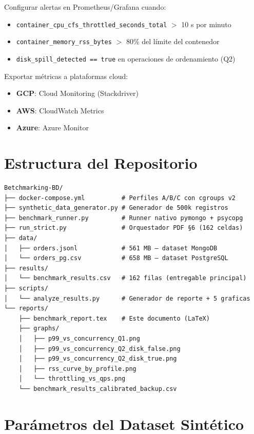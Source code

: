 \documentclass[12pt,a4paper]{article}
\begin{document}
Configurar alertas en Prometheus/Grafana cuando:
\begin{itemize}
  \item \texttt{container\_cpu\_cfs\_throttled\_seconds\_total} $>$ 10 s por minuto
  \item \texttt{container\_memory\_rss\_bytes} $>$ 80\% del límite del contenedor
  \item \texttt{disk\_spill\_detected == true} en operaciones de ordenamiento (Q2)
\end{itemize}

Exportar métricas a plataformas cloud:
\begin{itemize}
  \item \textbf{GCP}: Cloud Monitoring (Stackdriver)
  \item \textbf{AWS}: CloudWatch Metrics
  \item \textbf{Azure}: Azure Monitor
\end{itemize}

\appendix

\section{Estructura del Repositorio}

\begin{lstlisting}[caption={Árbol de archivos del proyecto}]
Betchmarking-BD/
├── docker-compose.yml          # Perfiles A/B/C con cgroups v2
├── synthetic_data_generator.py # Generador de 500k registros
├── benchmark_runner.py         # Runner nativo pymongo + psycopg
├── run_strict.py               # Orquestador PDF §6 (162 celdas)
├── data/
│   ├── orders.jsonl            # 561 MB — dataset MongoDB
│   └── orders_pg.csv           # 658 MB — dataset PostgreSQL
├── results/
│   └── benchmark_results.csv   # 162 filas (entregable principal)
├── scripts/
│   └── analyze_results.py      # Generador de reporte + 5 graficas
└── reports/
    ├── benchmark_report.tex    # Este documento (LaTeX)
    ├── graphs/
    │   ├── p99_vs_concurrency_Q1.png
    │   ├── p99_vs_concurrency_Q2_disk_false.png
    │   ├── p99_vs_concurrency_Q2_disk_true.png
    │   ├── rss_curve_by_profile.png
    │   └── throttling_vs_qps.png
    └── benchmark_results_calibrated_backup.csv
\end{lstlisting}

\section{Parámetros del Dataset Sintético}
\end{document}
